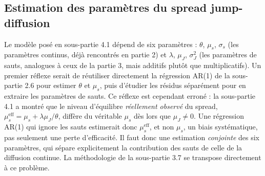 \documentclass{article}
\begin{document}
\subsection{Estimation des paramètres du spread jump-diffusion}
Le modèle posé en sous-partie 4.1 dépend de six paramètres : $\theta$, $\mu_s$, $\sigma_s$ (les paramètres continus, déjà rencontrés en partie 2) et $\lambda$, $\mu_J$, $\sigma_J^2$ (les paramètres de sauts, analogues à ceux de la partie 3, mais additifs plutôt que multiplicatifs). Un premier réflexe serait de réutiliser directement la régression AR(1) de la sous-partie 2.6 pour estimer $\theta$ et $\mu_s$, puis d'étudier les résidus séparément pour en extraire les paramètres de sauts. Ce réflexe est cependant erroné : la sous-partie 4.1 a montré que le niveau d'équilibre \emph{réellement observé} du spread, $\mu_s^{\text{eff}} = \mu_s + \lambda\mu_J/\theta$, diffère du véritable $\mu_s$ dès lors que $\mu_J\neq 0$. Une régression AR(1) qui ignore les sauts estimerait donc $\mu_s^{\text{eff}}$, et non $\mu_s$, un biais systématique, pas seulement une perte d'efficacité. Il faut donc une estimation \emph{conjointe} des six paramètres, qui sépare explicitement la contribution des sauts de celle de la diffusion continue. La méthodologie de la sous-partie 3.7 se transpose directement à ce problème.
\end{document}
